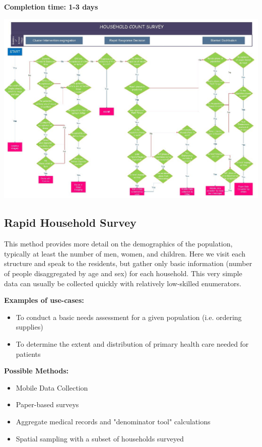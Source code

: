 \documentclass[a4paper,12pt,twoside]{article}
\begin{document}
\noindent
\textbf{Completion time: 1-3 days}

\includegraphics[width=1\textwidth]{images/Household_Count.jpeg}

\newpage
\subsection{Rapid Household Survey}
This method provides more detail on the demographics of the population, typically at least the number of men, women, and children. Here we visit each structure and speak to the residents, but gather only basic information (number of people disaggregated by age and sex) for each household. This very simple data can usually be collected quickly with relatively low-skilled enumerators.

\noindent
\textbf{Examples of use-cases:}

\begin{itemize}
    \item To conduct a basic needs assessment for a given population (i.e. ordering supplies)
    \item To determine the extent and distribution of primary health care needed for patients
\end{itemize}

\noindent
\textbf{Possible Methods:}
\begin{itemize}
    \item Mobile Data Collection
    \item Paper-based surveys
    \item Aggregate medical records and "denominator tool" calculations
    \item Spatial sampling with a subset of households surveyed
\end{itemize}
\end{document}
